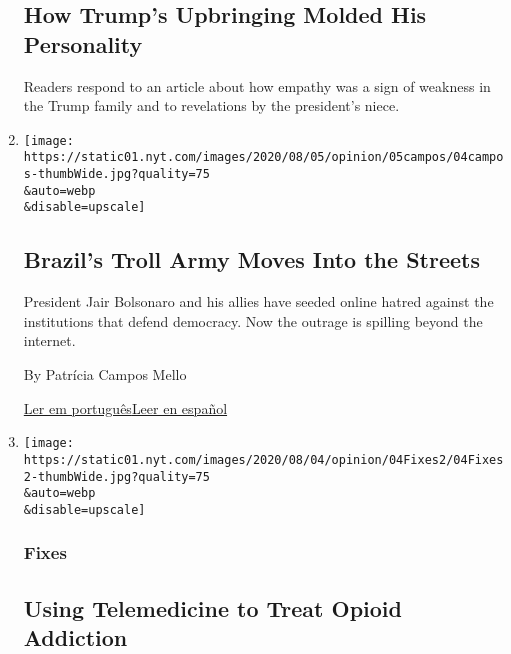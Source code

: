 \begin{enumerate}
  \hypertarget{how-trumps-upbringing-molded-his-personality}{%
  \subsection{How Trump's Upbringing Molded His
  Personality}\label{how-trumps-upbringing-molded-his-personality}}

  Readers respond to an article about how empathy was a sign of weakness
  in the Trump family and to revelations by the president's niece.
\item
  \href{/2020/08/04/opinion/bolsonaro-office-of-hate-brazil.html}{}

  \texttt{[image: https://static01.nyt.com/images/2020/08/05/opinion/05campos/04campos-thumbWide.jpg?quality=75\\\&auto=webp\\\&disable=upscale]}

  \hypertarget{brazils-troll-army-moves-into-the-streets}{%
  \subsection{Brazil's Troll Army Moves Into the
  Streets}\label{brazils-troll-army-moves-into-the-streets}}

  President Jair Bolsonaro and his allies have seeded online hatred
  against the institutions that defend democracy. Now the outrage is
  spilling beyond the internet.

  By Patrícia Campos Mello

  \href{https://www.nytimes.com/pt/2020/08/04/opinion/international-world/bolsonaro-gabinete-do-odio.html}{Ler
  em
  português}\href{https://www.nytimes.com/es/2020/08/04/espanol/opinion/bolsonaro-oficina-odio-brasil.html}{Leer
  en español}
\item
  \href{/2020/08/04/opinion/opioid-telemedicine-covid.html}{}

  \texttt{[image: https://static01.nyt.com/images/2020/08/04/opinion/04Fixes2/04Fixes2-thumbWide.jpg?quality=75\\\&auto=webp\\\&disable=upscale]}

  \hypertarget{fixes}{%
  \subsubsection{Fixes}\label{fixes}}

  \hypertarget{using-telemedicine-to-treat-opioid-addiction}{%
  \subsection{Using Telemedicine to Treat Opioid
  Addiction}\label{using-telemedicine-to-treat-opioid-addiction}}


\end{enumerate}
